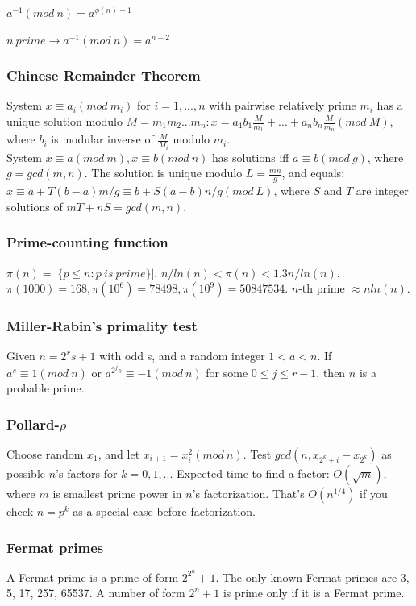 \documentclass[a4paper,13pt]{article}
\begin{document}
$a^{-1} (mod\ n) = a^{\phi(n)-1}$

$n\ prime \rightarrow a^{-1} (mod\ n) = a^{n-2}$

\subsubsection{Chinese Remainder Theorem}
System $x \equiv a_i (mod\ m_i)$ for $i = 1, ..., n$ with pairwise relatively prime $m_i$ has a unique solution modulo $M = m_1m_2...m_n : x = a_1b_1\frac{M}{m_1} + ... + a_nb_n\frac{M}{m_n} (mod\ M)$, where $b_i$ is modular inverse of $\frac{M}{M_i}$ modulo $m_i$.\\
System $x \equiv a (mod\ m), x \equiv b (mod\ n)$ has solutions iff $a \equiv b (mod\ g)$, where $g = gcd(m,n)$. The solution is unique modulo $L = \frac{mn}{g}$, and equals: $x \equiv a + T(b-a)m/g \equiv b + S(a-b)n/g (mod\ L)$, where $S$ and $T$ are integer solutions of $mT + nS = gcd(m,n)$.

\subsubsection{Prime-counting function}
$\pi(n) = |\{p \leq n : p\ is\ prime\}|$. $n / ln(n) < \pi(n) < 1.3n / ln(n)$. $\pi(1000) = 168, \pi(10^6) = 78498, \pi(10^9) = 50 847 534$. $n$-th prime $\approx n ln(n)$.

\subsubsection{Miller-Rabin's primality test}
Given $n = 2^{r}s + 1$ with odd s, and a random integer $1 < a < n$. If $a^{s} \equiv 1 (mod\ n)$ or $a^{2^{j}s} \equiv -1 (mod\ n)$ for some $0 \leq j \leq r-1$, then $n$ is a probable prime.

\subsubsection{Pollard-$\rho$}
Choose random $x_1$, and let $x_{i+1} = x_{i}^{2} (mod\ n)$. Test $gcd(n,x_{2^k+i} - x_{2^k})$ as possible $n$'s factors for $k = 0, 1, ...$ Expected time to find a factor: $O(\sqrt{m})$, where $m$ is smallest prime power in $n$'s factorization. That's $O(n^{1/4})$ if you check $n = p^k$ as a special case before factorization.

\subsubsection{Fermat primes}
A Fermat prime is a prime of form $2^{2^n} + 1$. The only known Fermat primes are 3, 5, 17, 257, 65537. A number of form $2^{n} + 1$ is prime only if it is a Fermat prime.
\end{document}
